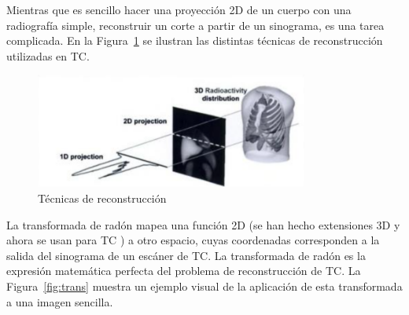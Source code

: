 Mientras que es sencillo hacer una proyección 2D de un cuerpo con una radiografía simple, reconstruir un corte a partir de un sinograma, es una tarea complicada. En la Figura~\ref{fig:tecnicas-reconstrucion} se ilustran las distintas técnicas de reconstrucción utilizadas en TC.

\begin{figure}[!htbp]
    \centering
    \includegraphics[width=0.8\textwidth]{img/tecnicas_reconstrucion.png}
    \caption{Técnicas de reconstrucción \parencite{bmeReconstruction}}
    \label{fig:tecnicas-reconstrucion}
\end{figure}

La transformada de radón mapea una función 2D (se han hecho extensiones 3D y ahora se usan para TC \parencite{vassholz2016new}) a otro espacio, cuyas coordenadas corresponden a la salida del sinograma de un escáner de TC.
La transformada de radón es la expresión matemática perfecta del problema de reconstrucción de TC. La Figura~\ref{fig:trans} muestra un ejemplo visual de la aplicación de esta transformada a una imagen sencilla.

